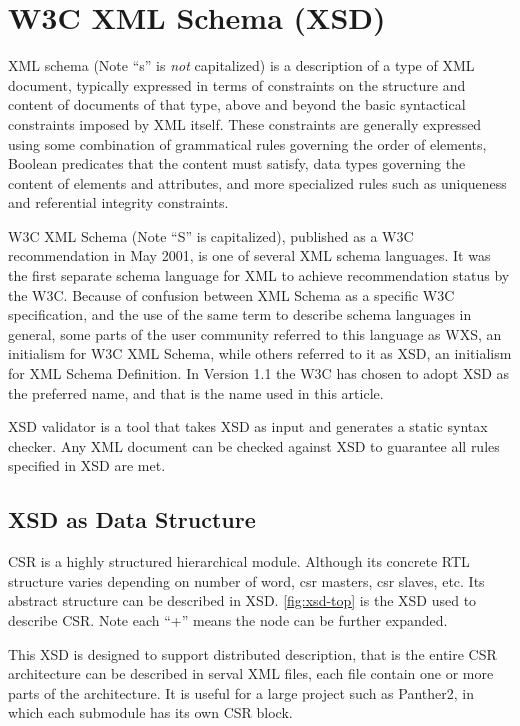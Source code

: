 \documentclass[10pt,oneside]{book}
\begin{document}
\chapter{W3C XML Schema (XSD)}
XML schema (Note ``s'' is \emph{not} capitalized) is 
a description of a type of XML document, typically expressed in terms
of constraints on the structure and content of documents of that type,
above and beyond the basic syntactical constraints imposed by XML
itself. These constraints are generally expressed using some
combination of grammatical rules governing the order of elements,
Boolean predicates that the content must satisfy, data types governing
the content of elements and attributes, and more specialized rules
such as uniqueness and referential integrity constraints.

W3C XML Schema (Note ``S'' is capitalized), published as a W3C
recommendation in May 2001, is one of several XML schema
languages. It was the first separate schema language for XML to
achieve recommendation status by the W3C. Because of confusion between
XML Schema as a specific W3C specification, and the use of the same
term to describe schema languages in general, some parts of the user
community referred to this language as WXS, an initialism for W3C XML
Schema, while others referred to it as XSD, an initialism for XML
Schema Definition. In Version 1.1 the W3C has chosen to adopt
XSD as the preferred name, and that is the name used in this article.

XSD validator is a tool that takes XSD as input and generates a static 
syntax checker. Any XML document can be checked against XSD to guarantee
all rules specified in XSD are met. 

\section{XSD as Data Structure}
CSR is a highly structured hierarchical module. Although its concrete
RTL structure varies depending on number of \gls{word}, \gls{csr master}s, 
\gls{csr slave}s, etc. Its abstract structure can be described in XSD. 
\autoref{fig:xsd-top} is the XSD used to describe CSR. Note each ``+'' 
means the node can be further expanded. 

This XSD is designed to support distributed description, that is the entire
CSR architecture can be described in serval XML files, each file contain one 
or more parts of the architecture. It is useful for a large project such as
Panther2, in which each submodule has its own CSR block. 
\end{document}
